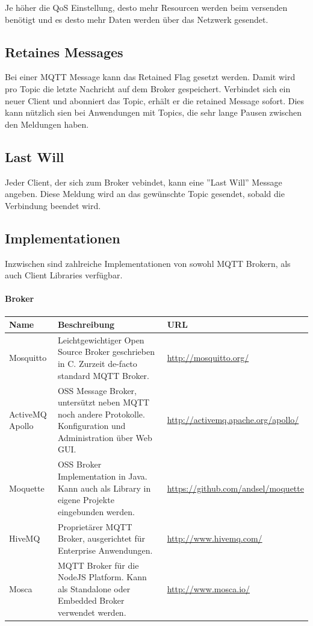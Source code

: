 Je höher die QoS Einstellung, desto mehr Resourcen werden beim versenden benötigt und es desto mehr Daten werden über das Netzwerk gesendet.

\subsection{Retaines Messages} \label{retained}
Bei einer MQTT Message kann das Retained Flag gesetzt werden. Damit wird pro Topic die letzte Nachricht auf dem Broker gespeichert. Verbindet sich ein neuer Client und abonniert das Topic, erhält er die retained Message sofort. Dies kann nützlich sien bei Anwendungen mit Topics, die sehr lange Pausen zwischen den Meldungen haben.

\subsection{Last Will}
Jeder Client, der sich zum Broker vebindet, kann eine ''Last Will'' Message angeben. Diese Meldung wird an das gewünschte Topic gesendet, sobald die Verbindung beendet wird.

\pagebreak

\subsection{Implementationen}
Inzwischen sind zahlreiche Implementationen von sowohl MQTT Brokern, als auch Client Libraries verfügbar.

\paragraph{Broker}

\begin{center}
\begin{tabular}{ | m{5em} | m{25em}| m{12em} | }
 \hline \rowcolor{lightgray}
 Name & Beschreibung & URL \\
 \hline
 Mosquitto  & Leichtgewichtiger Open Source Broker geschrieben in C. Zurzeit de-facto standard MQTT Broker. & \url{http://mosquitto.org/}  \\
 \hline
 ActiveMQ Apollo   & OSS Message Broker, untersützt neben MQTT noch andere Protokolle. Konfiguration und Administration über Web GUI. & \url{http://activemq.apache.org/apollo/}  \\
  \hline
 Moquette  & OSS Broker Implementation in Java. Kann auch als Library in eigene Projekte eingebunden werden. & \url{https://github.com/andsel/moquette}  \\
 \hline
  HiveMQ  & Proprietärer MQTT Broker, ausgerichtet für Enterprise Anwendungen.  & \url{http://www.hivemq.com/}  \\
 \hline
  Mosca  & MQTT Broker für die NodeJS Platform. Kann als Standalone oder Embedded Broker verwendet werden.  & \url{http://www.mosca.io/}  \\
\hline

\end{tabular}
\end{center}



